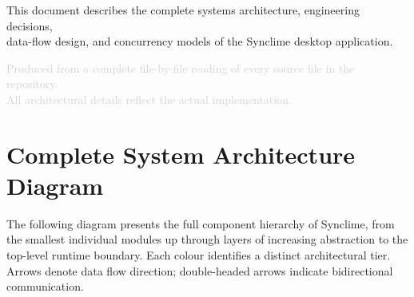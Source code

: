 \documentclass[10pt,letterpaper]{article}
\begin{document}
\begin{titlepage}
\begin{center}
    \vspace{1.8cm}
    {\small\color{MidGray}
      This document describes the complete systems architecture, engineering decisions,\\
      data-flow design, and concurrency models of the Synclime desktop application.
    }
  \end{center}
  \vfill
  \begin{center}
    \textcolor{LightGray}{\footnotesize
      Produced from a complete file-by-file reading of every source file in the repository.\\
      All architectural details reflect the actual implementation.
    }
  \end{center}
\end{titlepage}

\tableofcontents
\newpage

\section{Complete System Architecture Diagram}

The following diagram presents the full component hierarchy of Synclime, from the
smallest individual modules up through layers of increasing abstraction to the
top-level runtime boundary. Each colour identifies a distinct architectural tier.
Arrows denote data flow direction; double-headed arrows indicate bidirectional
communication.

\thispagestyle{fancy}
\end{document}
